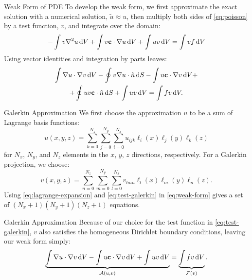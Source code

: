 \begin{frame}{Weak Form of PDE}
  To develop the weak form, we first approximate the exact solution with a numerical solution, $\tilde{u}\approx u$, then multiply both sides of \cref{eq:poisson} by a test function, $v$, and integrate over the domain:
  \begin{equation}
    -\int v\nabla^2 u\odif{V}+ \int v\mathbf{c}\cdot \nabla u\odif{V}+ \int uv\odif{V}= \int vf\odif{V}
  \end{equation}
  Using vector identities and integration by parts leaves:
  \begin{multline}
    \int \nabla u\cdot\nabla v\odif{V}-\oint v\nabla u\cdot\hat{n}\odif{S}-\int u\mathbf{c}\cdot\nabla v\odif{V}+\\+\oint uv\mathbf{c}\cdot\hat{n}\odif{S}+\int uv\odif{V}=\int fv\odif{V}.
  \end{multline}
\end{frame}

\begin{frame}{Galerkin Approximation}
  We first choose the approximation $u$ to be a sum of Lagrange basis functions:
  \begin{equation}
    \label{eq:lagrange-expansion}
    u(x,y,z)=\sum_{k=0}^{N_z}\sum_{j=0}^{N_y}\sum_{i=0}^{N_x}u_{ijk}\ell_i(x)\ell_j(y)\ell_k(z)
  \end{equation}
  for $N_x$, $N_y$, and $N_z$ elements in the $x$, $y$, $z$ directions, respectively.
  For a Galerkin projection, we choose:
  \begin{equation}
    \label{eq:test-galerkin}
    v(x,y,z)=\sum_{n=0}^{N_z}\sum_{m=0}^{N_y}\sum_{l=0}^{N_x}v_{lmn}\ell_l(x)\ell_m(y)\ell_n(z).
  \end{equation}
  Using \cref{eq:lagrange-expansion} and \cref{eq:test-galerkin} in \cref{eq:weak-form} gives a set of $(N_x+1)(N_y+1)(N_z+1)$ equations.
\end{frame}

\begin{frame}{Galerkin Approximation}
  Because of our choice for the test function in \cref{eq:test-galerkin}, $v$ also satisfies the homogeneous Dirichlet boundary conditions, leaving our weak form simply:
  \begin{equation}
    \label{eq:weak-form}
    \underbrace{\int \nabla u\cdot\nabla v\odif{V} -\int u\mathbf{c}\cdot\nabla v\odif{V} + \int uv\odif{V}}_{\mathcal{A}\left(u,v\right)}=\underbrace{\int fv\odif{V}}_{\mathcal{F}(v)}.
  \end{equation}

\end{frame}

